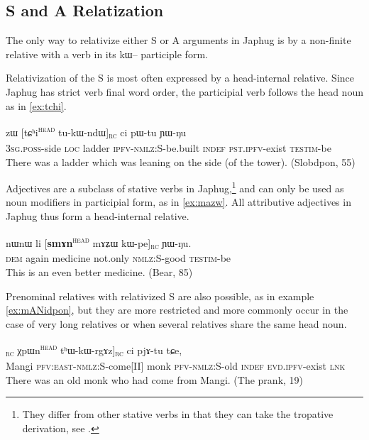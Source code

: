 \documentclass[oldfontcommands,oneside,a4paper,11pt]{article}
\newcommand{\ipa}[1]{{\phon #1}} %
\newcommand{\tete}{\textsuperscript{\textsc{head}}}
\newcommand{\rc}{\textsubscript{\textsc{rc}}}
\begin{document}
\subsection{S and A Relatization}
The only way to relativize either S or A arguments in Japhug is by a non-finite relative with a verb in its \ipa{kɯ--} participle form. 

Relativization of the S is most often expressed by a head-internal relative. Since Japhug has strict verb final word order,  the participial verb follows the head noun as in \ref{ex:tchi}.

 \begin{exe}
   \ex   \label{ex:tchi}
 \gll  	\ipa{ɯ-ɣmbɤj}  	\ipa{zɯ}  	[\ipa{tɕʰi}\tete{}  	\ipa{tu-kɯ-ndɯ}]\rc{}  	\ipa{ci}  	\ipa{pɯ-tu}  	\ipa{ɲɯ-ŋu}  		\\
\textsc{3sg.poss}-side \textsc{loc} ladder \textsc{ipfv-nmlz:S}-be.built  \textsc{indef} \textsc{pst.ipfv}-exist \textsc{testim}-be  \\
 \glt    There was a ladder which was leaning on the side (of the tower). (Slobdpon, 55)
   \end{exe} 

Adjectives are a subclass of stative verbs in Japhug,\footnote{They differ from other stative verbs in that they can take the tropative derivation, see \citet{jacques13tropative}. } and can only be used as noun modifiers in participial form, as in \ref{ex:mazw}. All attributive adjectives in Japhug thus form a head-internal relative.

 \begin{exe}
   \ex   \label{ex:mazw}
 \gll 
\ipa{nɯnɯ}  	\ipa{li}  	[\textbf{\ipa{smɤn}}\tete{}   	\ipa{mɤʑɯ}  	\ipa{kɯ-pe}]\rc{}  	\ipa{ɲɯ-ŋu.}  \\
\textsc{dem} again medicine not.only \textsc{nmlz:S}-good \textsc{testim}-be \\
 \glt    This is an even better medicine. (Bear, 85)
   \end{exe} 

Prenominal relatives with relativized S are also possible, as in example  \ref{ex:mANidpon}, but they are more restricted and more commonly occur in the case of very long relatives or when several relatives share the same head noun.

\begin{exe}
   \ex  \label{ex:mANidpon}
\gll [[\ipa{mɤŋi}  	\ipa{kɤ-kɯ-ɣe}]\rc{}  	\ipa{χpɯn}\tete{}  	\ipa{tʰɯ-kɯ-rgɤz}]\rc{}  	\ipa{ci}  	\ipa{pjɤ-tu}  	\ipa{tɕe,}    	\\
Mangi \textsc{pfv:east-nmlz:S}-come[II] monk \textsc{pfv-nmlz:S}-old \textsc{indef} \textsc{evd.ipfv}-exist   \textsc{lnk} \\
 \glt  There was an old monk who had come from Mangi. (The prank, 19)
   \end{exe} 
\end{document}
